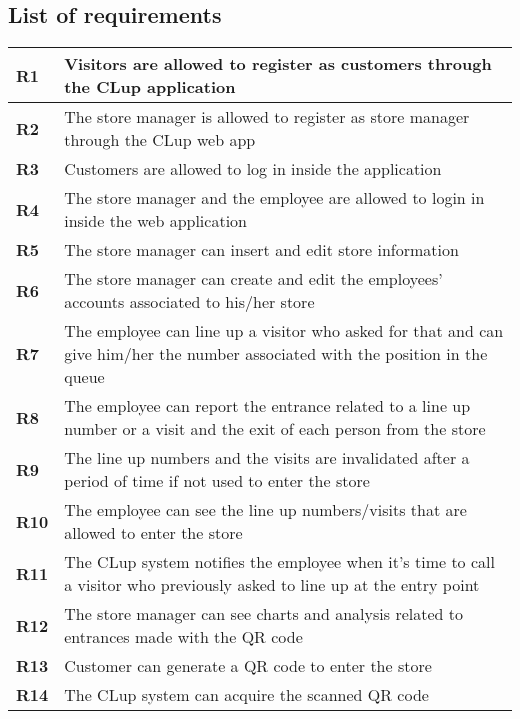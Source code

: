 \subsection{List of requirements}
\begin{center}
    {\renewcommand{\arraystretch}{2}
    \begin{longtable}{L{2cm}L{12cm}}
        \hline
        \textbf{R1} & Visitors are allowed to register as customers through the CLup application \\
        \hline
        \textbf{R2} & The store manager is allowed to register as store manager through the CLup web app \\
        \hline
        \textbf{R3} & Customers are allowed to log in inside the application \\
        \hline
        \textbf{R4} & The store manager and the employee are allowed to login in inside the web application \\
        \hline
        \textbf{R5} & The store manager can insert and edit store information \\
        \hline
        \textbf{R6} & The store manager can create and edit the employees' accounts associated to his/her store \\
        \hline
        \textbf{R7} & The employee can line up a visitor who asked for that and can give him/her the number associated with the position in the queue \\
        \hline
        \textbf{R8} & The employee can report the entrance related to a line up number or a visit and the exit of each person from the store \\
        \hline
        \textbf{R9} & The line up numbers and the visits are invalidated after a period of time if not used to enter the store \\
        \hline
        \textbf{R10} & The employee can see the line up numbers/visits that are allowed to enter the store \\
        \hline
        \textbf{R11} & The CLup system notifies the employee when it's time to call a visitor who previously asked to line up at the entry point \\
        \hline
        \textbf{R12} & The store manager can see charts and analysis related to entrances made with the QR code \\
        \hline
        \textbf{R13} & Customer can generate a QR code to enter the store \\
        \hline
        \textbf{R14} & The CLup system can acquire the scanned QR code \\

\end{longtable}}
\end{center}
